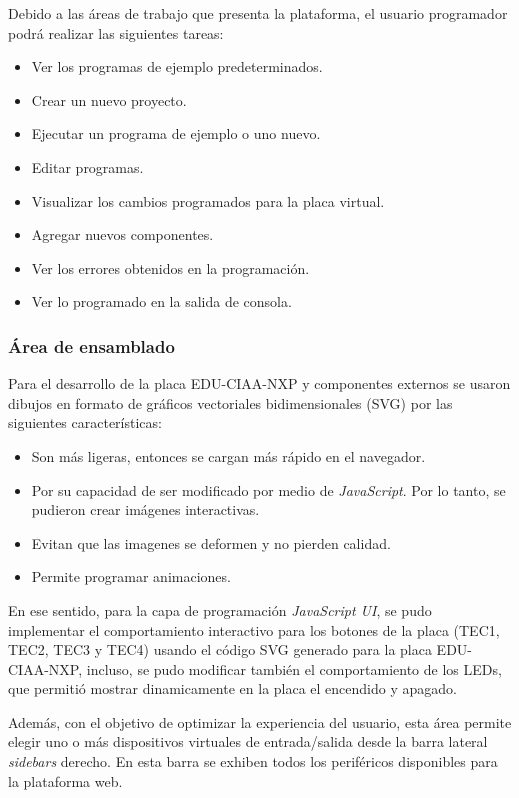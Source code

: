 Debido a las áreas de trabajo que presenta la plataforma, el usuario programador podrá realizar las siguientes tareas:

\begin{itemize}
	\item Ver los programas de ejemplo predeterminados.
	\item Crear un nuevo proyecto.
	\item Ejecutar un programa de ejemplo o uno nuevo.
	\item Editar programas.
	\item Visualizar los cambios programados para la placa virtual.
	\item Agregar nuevos componentes.
	\item Ver los errores obtenidos en la programación.
	\item Ver lo programado en la salida de consola.
\end{itemize}

\subsubsection{Área de ensamblado}

Para el desarrollo de la placa EDU-CIAA-NXP y componentes externos se usaron dibujos en formato de gráficos vectoriales bidimensionales (SVG) por las siguientes características:

\begin{itemize}
	\item Son más ligeras, entonces se cargan más rápido en el navegador.
    \item Por su capacidad de ser modificado por medio de \textit{JavaScript}. Por lo tanto, se pudieron crear imágenes interactivas.
	\item Evitan que las imagenes se deformen y no pierden calidad.
	\item Permite programar animaciones.
\end{itemize}

En ese sentido, para la capa de programación \textit{JavaScript UI}, se pudo implementar el comportamiento interactivo para los botones de la placa (TEC1, TEC2, TEC3 y TEC4) usando el código SVG generado para la placa EDU-CIAA-NXP, incluso, se pudo modificar también el comportamiento de los LEDs, que permitió mostrar dinamicamente en la placa el encendido y apagado.

Además, con el objetivo de optimizar la experiencia del usuario, esta área permite elegir uno o más dispositivos virtuales de entrada/salida desde la barra lateral \textit{sidebars} derecho. En esta barra se exhiben todos los periféricos disponibles para la plataforma web. 


